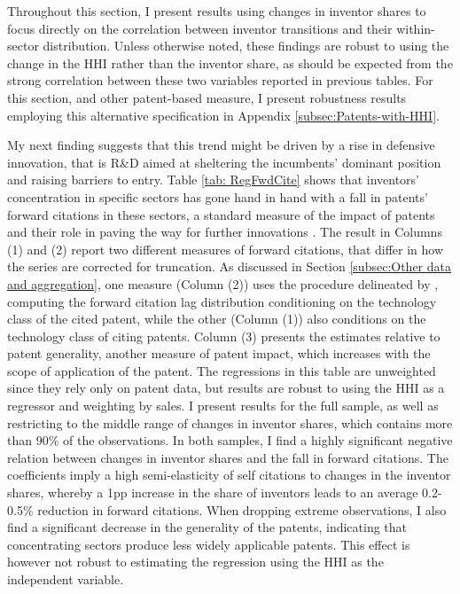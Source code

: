 Throughout this section, I present results using changes in inventor
shares to focus directly on the correlation between inventor transitions
and their within-sector distribution. Unless otherwise noted, these
findings are robust to using the change in the HHI rather than the
inventor share, as should be expected from the strong correlation
between these two variables reported in previous tables. For this
section, and other patent-based measure, I present robustness results
employing this alternative specification in Appendix \ref{subsec:Patents-with-HHI}.

My next finding suggests that this trend might be driven by a rise
in defensive innovation, that is R\&D aimed at sheltering the incumbents'
dominant position and raising barriers to entry. Table \ref{tab: RegFwdCite}
shows that inventors' concentration in specific sectors has gone hand
in hand with a fall in patents' forward citations in these sectors,
a standard measure of the impact of patents and their role in paving
the way for further innovations \citep{hallNBERPatentCitation2001}.
The result in Columns (1) and (2) report two different measures of
forward citations, that differ in how the series are corrected for
truncation. As discussed in Section \ref{subsec:Other data and aggregation},
one measure (Column (2)) uses the procedure delineated by \citet{hallNBERPatentCitation2001},
computing the forward citation lag distribution conditioning on the
technology class of the cited patent, while the other (Column (1))
also conditions on the technology class of citing patents. Column
(3) presents the estimates relative to patent generality, another
measure of patent impact, which increases with the scope of application
of the patent. The regressions in this table are unweighted since
they rely only on patent data, but results are robust to using the
HHI as a regressor and weighting by sales. I present results for the
full sample, as well as restricting to the middle range of changes
in inventor shares, which contains more than 90\% of the observations.
In both samples, I find a highly significant negative relation between
changes in inventor shares and the fall in forward citations. The
coefficients imply a high semi-elasticity of self citations to changes
in the inventor shares, whereby a 1pp increase in the share of inventors
leads to an average 0.2-0.5\% reduction in forward citations. When
dropping extreme observations, I also find a significant decrease
in the generality of the patents, indicating that concentrating sectors
produce less widely applicable patents. This effect is however not
robust to estimating the regression using the HHI as the independent
variable. 


